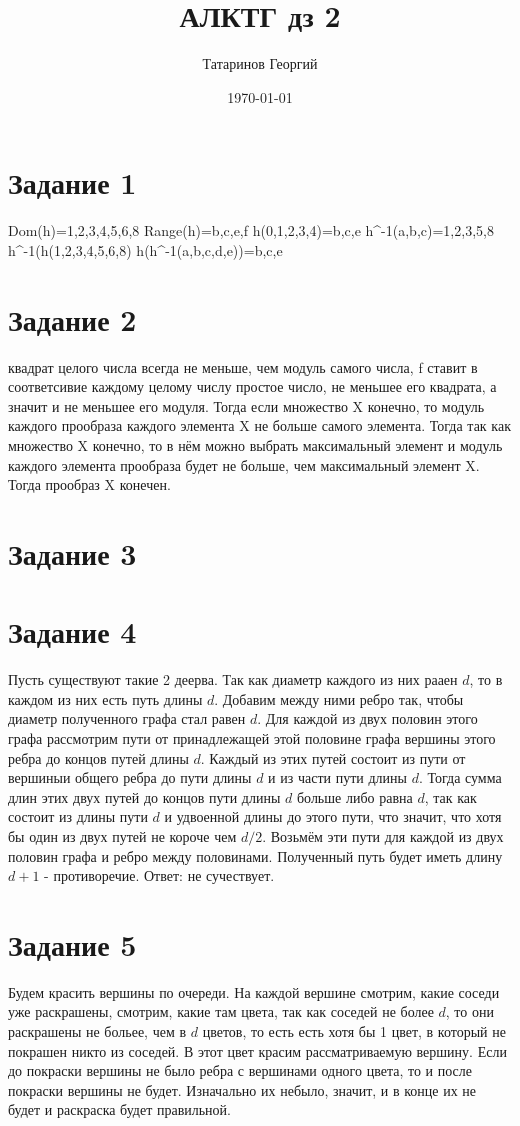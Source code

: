 \documentclass[a4paper, 12pt]{article}
\title{АЛКТГ дз 2}
\author{Татаринов Георгий}
\date{\today}
\begin{document}
	\section*{Задание 1}
		Dom(h)={1,2,3,4,5,6,8}
		Range(h)={b,c,e,f}
		h({0,1,2,3,4})={b,c,e}
		h^-1({a,b,c})={1,2,3,5,8}
		h^-1(h({1,2,3,4,5,6,8})
		h(h^-1({a,b,c,d,e}))={b,c,e}
	\section*{Задание 2}
		квадрат целого числа всегда не меньше, чем модуль самого числа, f ставит в соответсивие каждому целому числу простое число, не меньшее его квадрата, а значит и не меньшее его модуля. Тогда если множество X конечно, то модуль каждого прообраза каждого элемента X не больше самого элемента. Тогда так как множество X конечно, то в нём можно выбрать максимальный элемент и модуль каждого элемента прообраза будет не больше, чем максимальный элемент X. Тогда прообраз X конечен.
	\section*{Задание 3}
		
	\section*{Задание 4}
		Пусть существуют такие 2 деерва. Так как диаметр каждого из них рааен $d$, то в каждом из них есть путь длины $d$. Добавим между ними ребро так, чтобы диаметр полученного графа стал равен $d$. Для каждой из двух половин этого графа рассмотрим пути от принадлежащей этой половине графа вершины этого ребра до концов путей длины $d$. Каждый из этих путей состоит из пути от вершиныи общего ребра до пути длины $d$ и из части пути длины $d$. Тогда сумма длин этих двух путей до концов пути длины $d$ больше либо равна $d$, так как состоит из длины пути $d$ и удвоенной длины до этого пути, что значит, что хотя бы один из двух путей не короче чем $d/2$. Возьмём эти пути для каждой из двух половин графа и ребро между половинами. Полученный путь будет иметь длину $d+1$ - противоречие.
		Ответ: не сучествует.
	\section*{Задание 5}
		Будем красить вершины по очереди. На каждой вершине смотрим, какие соседи уже раскрашены, смотрим, какие там цвета, так как соседей не более $d$, то они раскрашены не больее, чем в $d$ цветов, то есть есть хотя бы 1 цвет, в который не покрашен никто из соседей. В этот цвет красим рассматриваемую вершину. Если до покраски вершины не было ребра с вершинами одного цвета, то и после покраски вершины не будет. Изначально их небыло, значит, и в конце их не будет и раскраска будет правильной.
\end{document}
